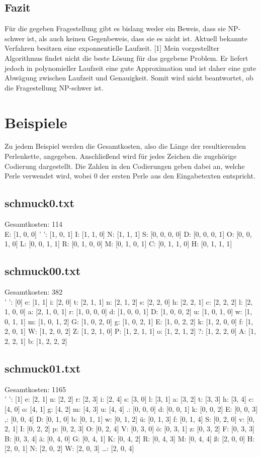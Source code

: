 \documentclass[a4paper,10pt,ngerman]{scrartcl}
\begin{document}
\subsection{Fazit}
Für die gegeben Fragestellung gibt es bislang weder ein Beweis, dass sie NP-schwer ist, als auch keinen Gegenbeweis, dass sie es nicht ist.
Aktuell bekannte Verfahren besitzen eine exponnentielle Laufzeit. [1]
Mein vorgestellter Algorithmus findet nicht die beste Lösung für das gegebene Problem. Er liefert jedoch in polynomieller Laufzeit eine gute Approximation
und ist daher eine gute Abwägung zwischen Laufzeit und Genauigkeit.
Somit wird nicht beantwortet, ob die Fragestellung NP-schwer ist.

\section{Beispiele}
Zu jedem Beispiel werden die Gesamtkosten, also die Länge der resultierenden Perlenkette, angegeben.  
Anschließend wird für jedes Zeichen die zugehörige Codierung dargestellt.  
Die Zahlen in den Codierungen geben dabei an, welche Perle verwendet wird, wobei 0 der ersten Perle aus den Eingabetexten entspricht.


\subsection{schmuck0.txt}
Gesamtkosten: 114\\
E: [1, 0, 0]
' ': [1, 0, 1]
I: [1, 1, 0]
N: [1, 1, 1]
S: [0, 0, 0, 0]
D: [0, 0, 0, 1]
O: [0, 0, 1, 0]
L: [0, 0, 1, 1]
R: [0, 1, 0, 0]
M: [0, 1, 0, 1]
C: [0, 1, 1, 0]
H: [0, 1, 1, 1]
\subsection{schmuck00.txt}
Gesamtkosten: 382 \\
' ': [0]
e: [1, 1]
i: [2, 0]
t: [2, 1, 1]
n: [2, 1, 2]
s: [2, 2, 0]
h: [2, 2, 1]
c: [2, 2, 2]
l: [2, 1, 0, 0]
a: [2, 1, 0, 1]
r: [1, 0, 0, 0]
d: [1, 0, 0, 1]
D: [1, 0, 0, 2]
u: [1, 0, 1, 0]
w: [1, 0, 1, 1]
m: [1, 0, 1, 2]
G: [1, 0, 2, 0]
g: [1, 0, 2, 1]
E: [1, 0, 2, 2]
k: [1, 2, 0, 0]
f: [1, 2, 0, 1]
W: [1, 2, 0, 2]
Z: [1, 2, 1, 0]
P: [1, 2, 1, 1]
o: [1, 2, 1, 2]
?: [1, 2, 2, 0]
A: [1, 2, 2, 1]
b: [1, 2, 2, 2]
\subsection{schmuck01.txt}
Gesamtkosten: 1165\\
' ': [1]
e: [2, 1]
n: [2, 2]
r: [2, 3]
i: [2, 4]
s: [3, 0]
l: [3, 1]
a: [3, 2]
t: [3, 3]
h: [3, 4]
c: [4, 0]
o: [4, 1]
g: [4, 2]
m: [4, 3]
u: [4, 4]
.: [0, 0, 0]
d: [0, 0, 1]
k: [0, 0, 2]
E: [0, 0, 3]
,: [0, 0, 4]
D: [0, 1, 0]
b: [0, 1, 1]
w: [0, 1, 2]
ü: [0, 1, 3]
f: [0, 1, 4]
S: [0, 2, 0]
v: [0, 2, 1]
I: [0, 2, 2]
p: [0, 2, 3]
O: [0, 2, 4]
V: [0, 3, 0]
ö: [0, 3, 1]
z: [0, 3, 2]
F: [0, 3, 3]
B: [0, 3, 4]
ä: [0, 4, 0]
G: [0, 4, 1]
K: [0, 4, 2]
R: [0, 4, 3]
M: [0, 4, 4]
ß: [2, 0, 0]
H: [2, 0, 1]
N: [2, 0, 2]
W: [2, 0, 3]
…: [2, 0, 4]
\end{document}
